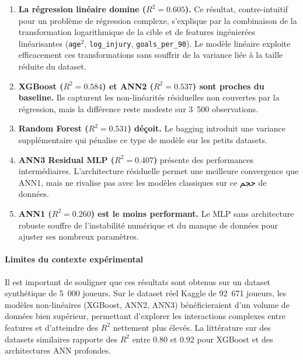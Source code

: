 \documentclass[12pt,a4paper]{article}
\begin{document}
\begin{enumerate}[leftmargin=*]
    \item \textbf{La régression linéaire domine ($R^2 = 0.605$).} Ce résultat,
    contre-intuitif pour un problème de régression complexe, s'explique par la
    combinaison de la transformation logarithmique de la cible et de features
    ingénierées linéarisantes (\texttt{age}$^2$, \texttt{log\_injury},
    \texttt{goals\_per\_90}). Le modèle linéaire exploite efficacement ces
    transformations sans souffrir de la variance liée à la taille réduite du dataset.

    \item \textbf{XGBoost ($R^2 = 0.584$) et ANN2 ($R^2 = 0.537$) sont proches
    du baseline.} Ils capturent les non-linéarités résiduelles non couvertes par la
    régression, mais la différence reste modeste sur 3~500 observations.

    \item \textbf{Random Forest ($R^2 = 0.531$) déçoit.} Le bagging introduit une
    variance supplémentaire qui pénalise ce type de modèle sur les petits datasets.

    \item \textbf{ANN3 Residual MLP ($R^2 = 0.407$) } présente des performances
    intermédiaires. L'architecture résiduelle permet une meilleure convergence que ANN1,
    mais ne rivalise pas avec les modèles classiques sur ce حجم de données.

    \item \textbf{ANN1 ($R^2 = 0.260$) est le moins performant.} Le
    MLP sans architecture robuste souffre de l'instabilité numérique et du manque
    de données pour ajuster ses nombreux paramètres.
\end{enumerate}

\paragraph{Limites du contexte expérimental}

Il est important de souligner que ces résultats sont obtenus sur un dataset synthétique
de 5~000 joueurs. Sur le dataset réel Kaggle de 92~671 joueurs, les modèles non-linéaires
(XGBoost, ANN2, ANN3) bénéficieraient d'un volume de données bien supérieur, permettant
d'explorer les interactions complexes entre features et d'atteindre des $R^2$ nettement
plus élevés. La littérature sur des datasets similaires rapporte des $R^2$ entre 0.80 et
0.92 pour XGBoost et des architectures ANN profondes.
\end{document}
